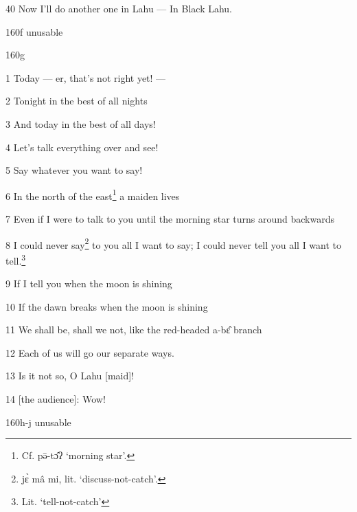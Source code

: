 40 Now I'll do another one in Lahu --- In Black Lahu.

160f unusable

160g

1 Today --- er, that's not right yet! ---

2 Tonight in the best of all nights

3 And today in the best of all days!

4 Let's talk everything over and see!

5 Say whatever you want to say!

6 In the north of the east\footnote{Cf. pə̄-tɔ̂ʔ `morning star'.} a maiden lives

7 Even if I were to talk to you until the morning star turns around backwards

8 I could never say\footnote{jɛ̀ mâ mi, lit. `discuss-not-catch'.} to you all I want to say; I could never tell you all I want
to tell.\footnote{Lit. `tell-not-catch'}

9 If I tell you when the moon is shining

10 If the dawn breaks when the moon is shining

11 We shall be, shall we not, like the red-headed a-bɛ̂ branch

12 Each of us will go our separate ways.

13 Is it not so, O Lahu [maid]!

14 [the audience]: Wow!

160h-j unusable

